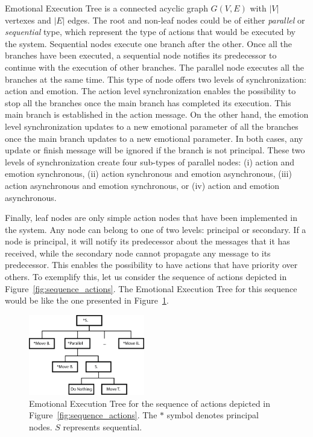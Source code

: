 Emotional Execution Tree is a connected acyclic graph $G(V,E)$ with $|V|$ vertexes and $|E|$ edges. The root and non-leaf nodes could be of either \textit{parallel} or \textit{sequential} type, which represent the type of actions that would be executed by the system. Sequential nodes execute one branch after the other. Once all the branches have been executed, a sequential node notifies its predecessor to continue with the execution of other branches. The parallel node executes all the branches at the same time. This type of node offers two levels of synchronization: action and emotion. The action level synchronization enables the possibility to stop all the branches once the main branch has completed its execution. This main branch is established in the action message. On the other hand, the emotion level synchronization updates to a new emotional parameter of all the branches once the main branch updates to a new emotional parameter. %
In both cases, any update or finish message will be ignored if the branch is not principal. These two levels of synchronization create four sub-types of parallel nodes: (i) action and emotion synchronous, (ii) action synchronous and emotion asynchronous, (iii) action asynchronous and emotion synchronous, or (iv) action and emotion asynchronous. 
 
Finally, leaf nodes are only simple action nodes that have been implemented in the system. Any node can belong to one of two levels: principal or secondary. If a node is principal, it will notify its predecessor about the messages that it has received, while the secondary node cannot propagate any message to its predecessor. This enables the possibility to have actions that have priority over others. To exemplify this, let us consider the sequence of actions depicted in Figure~\ref{fig:sequence_actions}. The Emotional Execution Tree for this sequence would be like the one presented in Figure~\ref{fig:emotional_enrichment}.

\begin{figure}
	\centering
	\includegraphics[width=0.45\textwidth]{./Images/Representation.png}
	\caption{Emotional Execution Tree for the sequence of actions depicted in Figure~\ref{fig:sequence_actions}. The $*$ symbol denotes principal nodes. $S$ represents sequential.}
	\label{fig:emotional_enrichment}
\end{figure}

